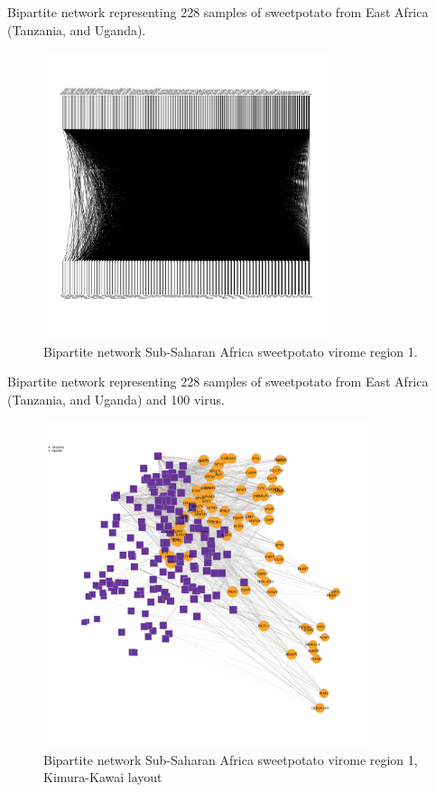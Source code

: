 \documentclass{article}
\begin{document}
Bipartite network representing 228 samples of sweetpotato from East Africa (Tanzania, and Uganda).

\begin{figure}[h!]
\begin{center}
\includegraphics[width=0.75\textwidth]{../results/k-cluster1/1-kcluster_bipartitenetwork_Feb28.pdf
} %
\caption{Bipartite network Sub-Saharan Africa sweetpotato virome region 1.}
\end{center}
\end{figure}

Bipartite network representing 228 samples of sweetpotato from East Africa (Tanzania, and Uganda) and 100 virus.


\begin{figure}[h!]
\begin{center}
\includegraphics[width=0.85\textwidth]{../results/k-cluster1/1-kcluster_bipartitenetwork-kk_Feb28.pdf
} %
\caption{Bipartite network Sub-Saharan Africa sweetpotato virome region 1, Kimura-Kawai layout}
\end{center}
\end{figure}
\end{document}
